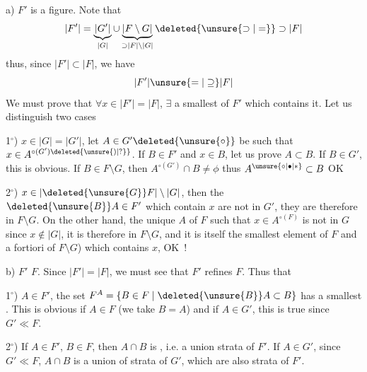 a) $F'$ is a figure.  Note that 
\[
 |F'|=\underbrace{|G'|}_{|G|}\cup\underbrace{|F\setminus G|}_{\supset |F|\setminus |G|}\deleted{\unsure{\supset|=}}\supset |F|
\]
thus, since $|F'|\subset |F|$, we have
\[
 |F'|\unsure{=|\supseteq}|F|
\]
We must prove that $\forall x\in |F'|=|F|$, $\exists$ a smallest  of $F'$ which contains it. Let us distinguish two cases

1$^\circ$) $x\in |G|=|G'|$, let $A\in G'\deleted{\unsure{\circ}}$ be such that $x\in A^{\circ(G')\deleted{\unsure{)|?}}}$. If $B\in F'$ and  $x\in B$, let us prove $A\subset B$. If $B\in G'$, this is obvious. If $B\in F\setminus G$, then  $A^{\circ(G')}\cap B\ne\phi$ thus $A^{\unsure{\circ|\bullet|*}}\subset B$ OK

2$^\circ$) $x\in |\deleted{\unsure{G}}F|\setminus |G|$, then the $\deleted{\unsure{B}}A\in F'$ which contain $x$ are not in $G'$, they are therefore in $F\setminus G$. On the other hand, the unique  $A$ of $F$ such that $x\in A^{\circ(F)}$ is not in $G$ since $x\notin |G|$, it is therefore in $F\setminus G$, and  it is itself the smallest element of $F$ and a fortiori of $F\setminus G$) which contains $x$, OK~!

b) $F'$  $F$. Since $|F'|=|F|$, we must see  that $F'$ refines $F$. Thus  that

1$^\circ$) \deleted{$\forall$} $A\in F'$, the set $F^A=\{B\in F\mid \deleted{\unsure{B}}A\subset B\}$ has a smallest . This is obvious if $A\in F$  (we take $B=A$) and if $A\in G'$, this is true since $G'\ll F$.

2$^\circ$) If $A\in F'$, $B\in F$, then $A\cap B$ is , i.e. a union  strata of $F'$. If $A\in G'$, since $G'\ll F$, $A\cap B$ is a union of strata of $G'$, which are also strata of $F'$.
